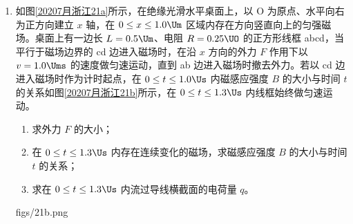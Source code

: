\documentclass[\gkver]{gaokaozhenti}
\begin{document}
\begin{enumerate}
{（3）滑块运动到距 A 点 $x$ 处的速度为 $v$，动能定理 $mgH-\mu mgx=\frac{1}{2}mv^{2}$，碰撞后的速度为 $v'$，动量守恒定律 $mv=3mv'$，设碰撞后滑块滑到斜轨道的高度为 $h$，动能定理

$-3\mu mg(L_{AB}-x)-3\mu mg\frac{h}{\tan\theta}-3mgh=0-\frac{1}{2}(3m)v'^{2}$

得 $h=\frac{1}{6}x-\frac{5}{48}$（$\frac{5}{8}\Um<x\leq1\Um$），$h=0$（$0\leq x\leq\frac{5}{8}\Um$）。
}

\item
如图\ref{20207月浙江21a}所示，在绝缘光滑水平桌面上，以 O 为原点、水平向右为正方向建立 $x$ 轴，在 $0\leq x\leq1.0\Um$ 区域内存在方向竖直向上的匀强磁场。桌面上有一边长 $L=0.5\Um$、电阻 $R=0.25\UO$ 的正方形线框 abcd，当平行于磁场边界的 cd 边进入磁场时，在沿 $x$ 方向的外力 $F$ 作用下以 $v=1.0\Ums$ 的速度做匀速运动，直到 ab 边进入磁场时撤去外力。若以 cd 边进入磁场时作为计时起点，在 $0\leq t\leq1.0\Us$ 内磁感应强度 $B$ 的大小与时间 $t$ 的关系如图\ref{20207月浙江21b}所示，在 $0\leq t\leq1.3\Us$ 内线框始终做匀速运动。
\begin{enumerate}
	\item
	求外力 $F$ 的大小；
	\item
	在 $0\leq t\leq1.3\Us$ 内存在连续变化的磁场，求磁感应强度 $B$ 的大小与时间 $t$ 的关系；
	\item
	求在 $0\leq t\leq1.3\Us$ 内流过导线横截面的电荷量 $q$。
\end{enumerate}

{figs/21b.png}
\end{enumerate}
\end{document}
